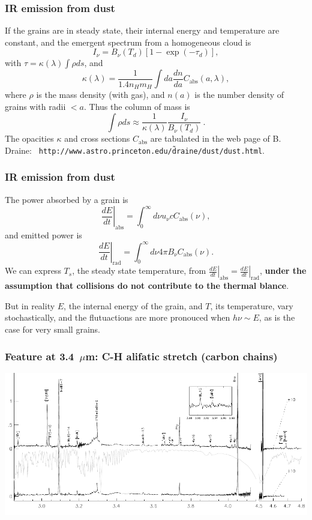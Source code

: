 \begin{frame}\frametitle{IR emission from dust}

If the grains are in steady state, their internal energy and
temperature are constant, and the emergent spectrum from a homogeneous
cloud is 
\[ 
I_\nu = B_\nu (T_d) \left[ 1 - \exp(-\tau_d) \right], 
\]
with  $\tau = \kappa(\lambda) \int \rho ds $, and
\[ 
\kappa(\lambda) = \frac{1}{1.4 n_H m_H} \int da \frac{dn}{da}
C_\mathrm{abs}(a,\lambda),
\]
where $\rho$ is the mass density (with gas), and $n(a)$ is the number
density of grains with radii $< a$. Thus the column of mass is 
\[
\int \rho ds \approx \frac{1}{\kappa(\lambda)}
\frac{I_\nu}{B_\nu(T_d)}~.
\]
The opacities $\kappa$ and cross sections $C_\mathrm{abs}$ are
tabulated in the web page of B. Draine: {\tt
http://www.astro.princeton.edu/\~draine/dust/dust.html}.

\end{frame}
\begin{frame}\frametitle{IR emission from dust}


The power absorbed by a grain is 
\[
\left.\frac{dE}{dt}\right|_\mathrm{abs} = \int_0^\infty d\nu u_\nu c
C_\mathrm{abs}(\nu),
\]
and emitted  power  is 
\[
\left.\frac{dE}{dt}\right|_\mathrm{rad} = \int_0^\infty d\nu 4\pi B_\nu
C_\mathrm{abs}(\nu).
\]
We can express $T_s$, the steady state temperature, from 
$\left.\frac{dE}{dt}\right|_\mathrm{abs} =
\left.\frac{dE}{dt}\right|_\mathrm{rad}$, {\bf under the assumption
that collisions do not contribute to the thermal blance}.

But in reality $E$, the internal energy of the grain, and $T$, its
temperature, vary stochastically, and the flutuactions are more
pronouced when $h\nu \sim E$, as is the case for very small
grains. 


\end{frame}
\begin{frame}\frametitle{Feature at   3.4~$\mu$m: C-H 
alifatic stretch (carbon chains)}

\begin{center}
  \includegraphics[width=\textwidth,height=!]{./D/specCGS4.pdf}
\end{center}

\end{frame}
